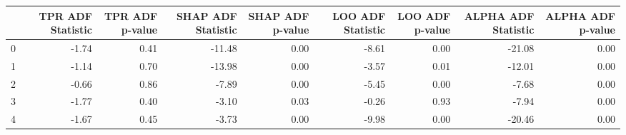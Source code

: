 \begin{tabular}{lrrrrrrrr}
\toprule
 & TPR ADF Statistic & TPR ADF p-value & SHAP ADF Statistic & SHAP ADF p-value & LOO ADF Statistic & LOO ADF p-value & ALPHA ADF Statistic & ALPHA ADF p-value \\
\midrule
0 & -1.74 & 0.41 & -11.48 & 0.00 & -8.61 & 0.00 & -21.08 & 0.00 \\
1 & -1.14 & 0.70 & -13.98 & 0.00 & -3.57 & 0.01 & -12.01 & 0.00 \\
2 & -0.66 & 0.86 & -7.89 & 0.00 & -5.45 & 0.00 & -7.68 & 0.00 \\
3 & -1.77 & 0.40 & -3.10 & 0.03 & -0.26 & 0.93 & -7.94 & 0.00 \\
4 & -1.67 & 0.45 & -3.73 & 0.00 & -9.98 & 0.00 & -20.46 & 0.00 \\
\bottomrule
\end{tabular}
